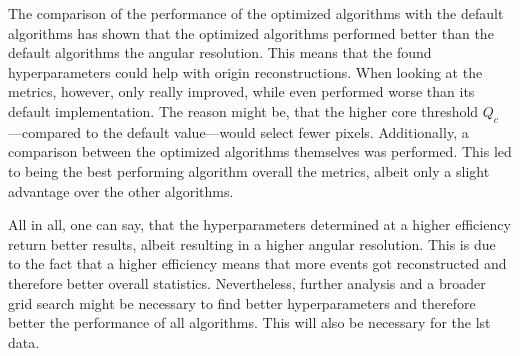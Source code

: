 The comparison of the performance of the optimized algorithms with the default algorithms has shown that
the optimized algorithms performed better than the default algorithms \wrt the angular resolution. This
means that the found hyperparameters could help with origin reconstructions. When looking at the metrics,
however, only \tcc{} really improved, while \fact{} even performed worse than its default implementation.
The reason might be, that the higher core threshold \(Q_c\)---compared to the default value---would
select fewer pixels. Additionally, a comparison between the optimized algorithms themselves was performed. This led to \fact{}
being the best performing algorithm overall \wrt the metrics, albeit only a slight advantage over the
other algorithms.

All in all, one can say, that the hyperparameters determined at a higher efficiency return better results,
albeit resulting in a higher angular resolution. This is due to the fact that a higher efficiency means
that more events got reconstructed and therefore better overall statistics. Nevertheless, further analysis
and a broader grid search might be necessary to find better hyperparameters
and therefore better the performance of all algorithms. This will also be necessary for the \gls{lst} data.

